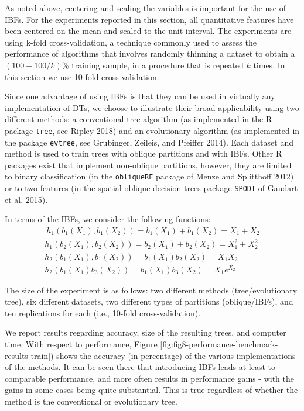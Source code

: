 \documentclass[]{elsarticle} %
\begin{document}
As noted above, centering and scaling the variables is important for the
use of IBFs. For the experiments reported in this section, all
quantitative features have been centered on the mean and scaled to the
unit interval. The experiments are using k-fold cross-validation, a
technique commonly used to assess the performance of algorithms that
involves randomly thinning a dataset to obtain a \((100 - 100/k)\)\%
training sample, in a procedure that is repeated \(k\) times. In this
section we use 10-fold cross-validation.

Since one advantage of using IBFs is that they can be used in virtually
any implementation of DTs, we choose to illustrate their broad
applicability using two different methods: a conventional tree algorithm
(as implemented in the R package \texttt{tree}, see Ripley 2018) and an
evolutionary algorithm (as implemented in the package \texttt{evtree},
see Grubinger, Zeileis, and Pfeiffer 2014). Each dataset and method is
used to train trees with oblique partitions and with IBFs. Other R
packages exist that implement non-oblique partitions, however, they are
limited to binary classification (in the \texttt{obliqueRF} package of
Menze and Splitthoff 2012) or to two features (in the spatial oblique
decision trees package \texttt{SPODT} of Gaudart et al. 2015).

In terms of the IBFs, we consider the following functions: \[
\begin{array}{c}\
h_1(b_1(X_1),b_1(X_2))=b_1(X_1)+b_1(X_2)=X_1+X_2\\
h_1(b_2(X_1),b_2(X_2))=b_2(X_1)+b_2(X_2)=X_1^2+X_2^2\\
h_2(b_1(X_1),b_1(X_2))=b_1(X_1)b_2(X_2)=X_1X_2\\
h_2(b_1(X_1)b_3(X_2))=b_1(X_1)b_3(X_2)=X_1e^{X_2}
\end{array}
\]

The size of the experiment is as follows: two different methods
(tree/evolutionary tree), six different datasets, two different types of
partitions (oblique/IBFs), and ten replications for each (i.e., 10-fold
cross-validation).

We report results regarding accuracy, size of the resulting trees, and
computer time. With respect to performance, Figure
\ref{fig:fig8-performance-benchmark-results-train}) shows the accuracy
(in percentage) of the various implementations of the methods. It can be
seen there that introducing IBFs leads at least to comparable
performance, and more often results in performance gains - with the
gains in some cases being quite substantial. This is true regardless of
whether the method is the conventional or evolutionary tree.
\end{document}
